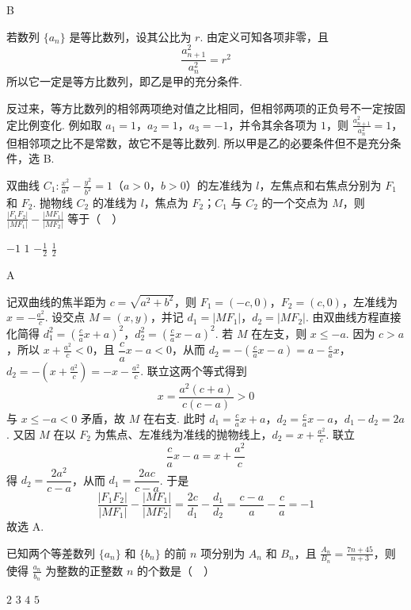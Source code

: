 \begin{answer}
B
\end{answer}

\begin{solution}
若数列 \(\{a_n\}\) 是等比数列，设其公比为 \(r\). 由定义可知各项非零，且
\[
\frac{a_{n+1}^2}{a_n^2}=r^2
\]
所以它一定是等方比数列，即乙是甲的充分条件.

反过来，等方比数列的相邻两项绝对值之比相同，但相邻两项的正负号不一定按固定比例变化. 例如取 \(a_1=1\)，\(a_2=1\)，\(a_3=-1\)，并令其余各项为 \(1\)，则 \(\frac{a_{n+1}^2}{a_n^2}=1\)，但相邻项之比不是常数，故它不是等比数列. 所以甲是乙的必要条件但不是充分条件，选 B.
\end{solution}

\begin{problem}
双曲线 \(C_1: \frac{x^2}{a^2} - \frac{y^2}{b^2} = 1\)（\(a > 0\)，\(b > 0\)）的左准线为 \(l\)，左焦点和右焦点分别为 \(F_1\) 和 \(F_2\). 抛物线 \(C_2\) 的准线为 \(l\)，焦点为 \(F_2\)；\(C_1\) 与 \(C_2\) 的一个交点为 \(M\)，则 \(\frac{|F_1F_2|}{|MF_1|} - \frac{|MF_1|}{|MF_2|}\) 等于（\(\quad\)）

\choices
    {\(-1\)}
    {\(1\)}
    {\(-\frac{1}{2}\)}
    {\(\frac{1}{2}\)}
\end{problem}

\begin{answer}
A
\end{answer}

\begin{solution}
记双曲线的焦半距为 \(c=\sqrt{a^2+b^2}\)，则 \(F_1=(-c,0)\)，\(F_2=(c,0)\)，左准线为 \(x=-\frac{a^2}{c}\). 设交点 \(M=(x,y)\)，并记 \(d_1=|MF_1|\)，\(d_2=|MF_2|\). 由双曲线方程直接化简得
\(d_1^2=\left(\frac{c}{a}x+a\right)^2\)，\(d_2^2=\left(\frac{c}{a}x-a\right)^2\).
若 \(M\) 在左支，则 \(x\leqslant-a\). 因为 \(c>a\)，所以 \(x+\frac{a^2}{c}<0\)，且 \(\dfrac ca x-a<0\)，从而
\(d_2=-\left(\frac ca x-a\right)=a-\frac ca x\)，\(d_2=-\left(x+\frac{a^2}{c}\right)=-x-\frac{a^2}{c}\).
联立这两个等式得到
\[
x=\frac{a^2(c+a)}{c(c-a)}>0
\]
与 \(x\leqslant-a<0\) 矛盾，故 \(M\) 在右支. 此时
\(d_1=\frac{c}{a}x+a\)，\(d_2=\frac{c}{a}x-a\)，\(d_1-d_2=2a\).
又因 \(M\) 在以 \(F_2\) 为焦点、左准线为准线的抛物线上，\(d_2=x+\frac{a^2}{c}\). 联立
\[
\frac{c}{a}x-a=x+\frac{a^2}{c}
\]
得 \(d_2=\dfrac{2a^2}{c-a}\)，从而 \(d_1=\dfrac{2ac}{c-a}\). 于是
\[
\frac{|F_1F_2|}{|MF_1|}-\frac{|MF_1|}{|MF_2|}
=\frac{2c}{d_1}-\frac{d_1}{d_2}
=\frac{c-a}{a}-\frac{c}{a}=-1
\]
故选 A.
\end{solution}

\begin{problem}
已知两个等差数列 \(\{a_{n}\}\) 和 \(\{b_{n}\}\) 的前 \(n\) 项分别为 \(A_{n}\) 和 \(B_{n}\)，且 \(\frac{A_{n}}{B_{n}} = \frac{7n + 45}{n + 3}\)，则使得 \(\frac{a_{n}}{b_{n}}\) 为整数的正整数 \(n\) 的个数是（\(\quad\)）

\choices
    {\(2\)}
    {\(3\)}
    {\(4\)}
    {\(5\)}
\end{problem}

